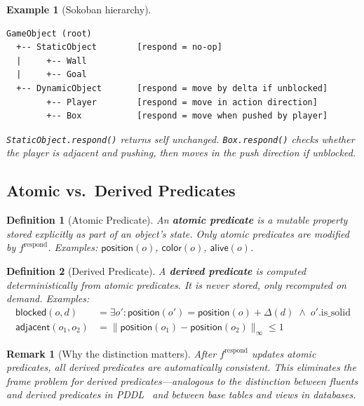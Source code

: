 \documentclass{article}
\newtheorem{definition}{Definition}
\newtheorem{remark}{Remark}
\newtheorem{example}{Example}
\begin{document}
\begin{example}[Sokoban hierarchy]
\label{ex:sokoban}
\begin{verbatim}
GameObject (root)
  +-- StaticObject        [respond = no-op]
  |     +-- Wall
  |     +-- Goal
  +-- DynamicObject       [respond = move by delta if unblocked]
        +-- Player        [respond = move in action direction]
        +-- Box           [respond = move when pushed by player]
\end{verbatim}
\texttt{StaticObject.respond()} returns self unchanged.
\texttt{Box.respond()} checks whether the player is adjacent and pushing,
then moves in the push direction if unblocked.
\end{example}

\subsection{Atomic vs.\ Derived Predicates}
\label{sec:predicates}

\begin{definition}[Atomic Predicate]
\label{def:atomic}
An \textbf{atomic predicate} is a mutable property stored explicitly as part
of an object's state.  Only atomic predicates are modified by
$f^{\text{respond}}$.  Examples: $\mathsf{position}(o)$,
$\mathsf{color}(o)$, $\mathsf{alive}(o)$.
\end{definition}

\begin{definition}[Derived Predicate]
\label{def:derived}
A \textbf{derived predicate} is computed deterministically from atomic
predicates.  It is never stored, only recomputed on demand.  Examples:
\begin{align}
    \mathsf{blocked}(o, d) &= \exists o' : \mathsf{position}(o')
        = \mathsf{position}(o) + \Delta(d) \;\wedge\; o'.\text{is\_solid} \\
    \mathsf{adjacent}(o_1, o_2) &= \|\mathsf{position}(o_1) -
        \mathsf{position}(o_2)\|_\infty \leq 1
\end{align}
\end{definition}

\begin{remark}[Why the distinction matters]
After $f^{\text{respond}}$ updates atomic predicates, all derived predicates
are automatically consistent.  This eliminates the frame problem for derived
predicates---analogous to the distinction between fluents and derived predicates
in PDDL~\cite{fox2003pddl2} and between base tables and views in databases.
\end{remark}
\end{document}
